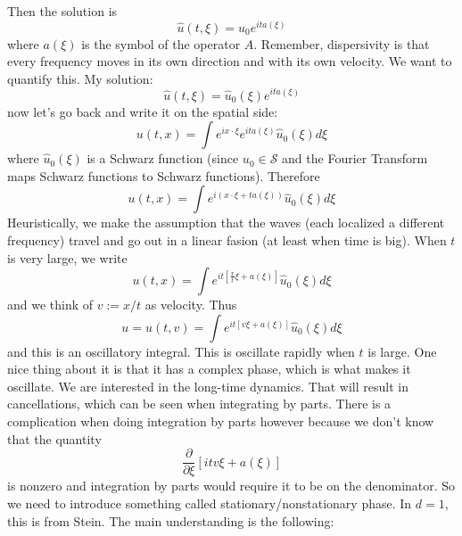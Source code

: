 \documentclass{article}
\begin{document}
Then the solution is
\begin{equation*}
  \hat{u}(t,\xi) = \hat{u}_{0}e^{it a(\xi)}
\end{equation*}
where $a(\xi)$  is the symbol of the operator $A$. Remember, dispersivity is
that every frequency moves in its own direction and with its own velocity. We
want to quantify this. My solution:
\begin{equation}\label{eq:3}
  \hat{u}(t,\xi) = \hat{u}_{0}(\xi)e^{ita(\xi)}
\end{equation}
now let's go back and write it on the spatial side:
\begin{equation*}
  u(t,x) = \int e^{ix\cdot\xi}e^{ita(\xi)}\hat{u}_{0}(\xi)d\xi
\end{equation*}
where $\hat{u}_{0}(\xi)$ is a Schwarz function (since $u_{0}\in \mathcal{S}$ and
the Fourier Transform maps Schwarz functions to Schwarz functions). Therefore
\begin{equation*}
  u(t,x) = \int e^{i(x\cdot\xi+ta(\xi))}\hat{u}_{0}(\xi)d\xi
\end{equation*}
Heuristically, we make the assumption that the waves (each localized a different
frequency) travel and go out in a linear fasion (at least when time is big).
When $t$ is very large, we write
\begin{equation*}
  u(t,x) = \int e^{it \left[ \frac{x}{t}\xi+a(\xi) \right] }\hat{u}_{0}(\xi)d\xi
\end{equation*}
and we think of $v:=x/t$ as velocity. Thus
\begin{equation*}
  u= u(t,v) = \int e^{it \left[ v\xi+a(\xi) \right] }\hat{u}_{0}(\xi)d\xi
\end{equation*}
and this is an oscillatory integral. This is oscillate rapidly when $t$ is
large. One nice thing about it is that it has a complex phase, which is what
makes it oscillate. We are interested in the long-time dynamics. That will
result in cancellations, which can be seen when integrating by parts. There is a
complication when doing integration by parts however because we don't know that
the quantity 
\begin{equation*}
  \frac{\partial }{\partial \xi} \left[ itv\xi +a(\xi) \right] 
\end{equation*}
is nonzero and integration by parts would require it to be on the denominator.
So we need to introduce something called stationary/nonstationary phase. In
$d=1$, this is from Stein. The main understanding is the following:
\end{document}
